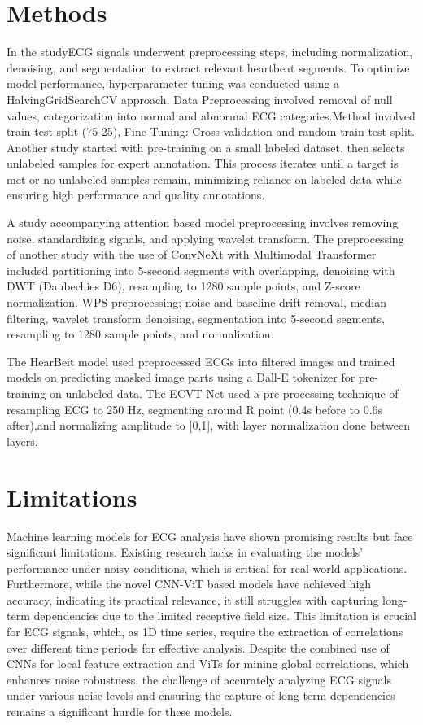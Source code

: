 \documentclass[conference]{IEEEtran}
\begin{document}
\section{Methods}

In the study\cite{b6}ECG signals underwent preprocessing steps, including normalization, denoising, and segmentation to extract relevant heartbeat segments. To optimize model performance, hyperparameter tuning was conducted using a HalvingGridSearchCV approach. Data Preprocessing\cite{b7} involved removal of null values, categorization into normal and abnormal ECG categories.Method involved train-test split (75-25), Fine Tuning: Cross-validation and random train-test split. Another study\cite{b12} started with pre-training on a small labeled dataset, then selects unlabeled samples for expert annotation. This process iterates until a target is met or no unlabeled samples remain, minimizing reliance on labeled data while ensuring high performance and quality annotations.

A study accompanying attention based model\cite{b15} preprocessing involves removing noise, standardizing signals, and applying wavelet transform. The preprocessing of another study with the use of ConvNeXt with Multimodal Transformer\cite{b18} included partitioning into 5-second segments with overlapping, denoising with DWT (Daubechies D6), resampling to 1280 sample points, and Z-score normalization. WPS preprocessing: noise and baseline drift removal, median filtering, wavelet transform denoising, segmentation into 5-second segments, resampling to 1280 sample points, and normalization.

The HearBeit\cite{b22} model used preprocessed ECGs into filtered images and trained models on predicting masked image parts using a Dall-E tokenizer for pre-training on unlabeled data. The ECVT-Net\cite{b24} used a pre-processing technique of resampling ECG to 250 Hz, segmenting around R point (0.4s before to 0.6s after),and  normalizing amplitude to [0,1], with layer normalization\cite{b25} done between layers.


\section{Limitations}


Machine learning models for ECG analysis have shown promising results but face significant limitations. Existing research lacks in evaluating the models' performance under noisy conditions, which is critical for real-world applications. Furthermore, while the novel CNN-ViT based models have achieved high accuracy, indicating its practical relevance, it still struggles with capturing long-term dependencies due to the limited receptive field size. This limitation is crucial for ECG signals, which, as 1D time series, require the extraction of correlations over different time periods for effective analysis. Despite the combined use of CNNs for local feature extraction and ViTs for mining global correlations, which enhances noise robustness, the challenge of accurately analyzing ECG signals under various noise levels and ensuring the capture of long-term dependencies remains a significant hurdle for these models.
\end{document}
